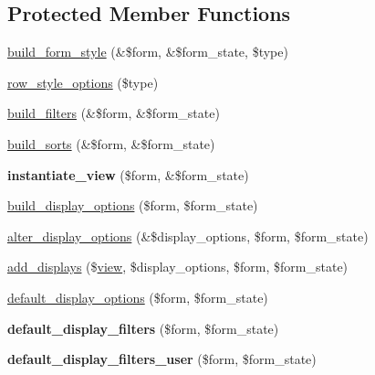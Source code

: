 \subsection*{Protected Member Functions}
\begin{DoxyCompactItemize}
\item 
\hyperlink{classViewsUiBaseViewsWizard_ac467f4635ccfcf169406f8c90c4e985c}{build\_\-form\_\-style} (\&\$form, \&\$form\_\-state, \$type)
\item 
\hyperlink{classViewsUiBaseViewsWizard_af5c8d4b868a5bf71075c373af3a96252}{row\_\-style\_\-options} (\$type)
\item 
\hyperlink{classViewsUiBaseViewsWizard_a796b382ac41d2b3cab1352fffac9a015}{build\_\-filters} (\&\$form, \&\$form\_\-state)
\item 
\hyperlink{classViewsUiBaseViewsWizard_ab6b0be6b141147b10dd10cf9eae59e0e}{build\_\-sorts} (\&\$form, \&\$form\_\-state)
\item 
\hypertarget{classViewsUiBaseViewsWizard_a8e37147b78b5b8790fca4829f7b47a8e}{
{\bfseries instantiate\_\-view} (\$form, \&\$form\_\-state)}
\label{classViewsUiBaseViewsWizard_a8e37147b78b5b8790fca4829f7b47a8e}

\item 
\hyperlink{classViewsUiBaseViewsWizard_a7a12effa5cd30673c45c00c4c21ee5dc}{build\_\-display\_\-options} (\$form, \$form\_\-state)
\item 
\hyperlink{classViewsUiBaseViewsWizard_ab27a3f84ed71dca5754bc53254f079f8}{alter\_\-display\_\-options} (\&\$display\_\-options, \$form, \$form\_\-state)
\item 
\hyperlink{classViewsUiBaseViewsWizard_a8d817fb64a28ebd753b40b0af96c19f4}{add\_\-displays} (\$\hyperlink{classview}{view}, \$display\_\-options, \$form, \$form\_\-state)
\item 
\hyperlink{classViewsUiBaseViewsWizard_a862c9e72a5e11fd78baa1992581f1410}{default\_\-display\_\-options} (\$form, \$form\_\-state)
\item 
\hypertarget{classViewsUiBaseViewsWizard_ace380f59825f718849e37250d11f6f3d}{
{\bfseries default\_\-display\_\-filters} (\$form, \$form\_\-state)}
\label{classViewsUiBaseViewsWizard_ace380f59825f718849e37250d11f6f3d}

\item 
\hypertarget{classViewsUiBaseViewsWizard_a53d02afb114c73e2db6b9a5735308399}{
{\bfseries default\_\-display\_\-filters\_\-user} (\$form, \$form\_\-state)}
\label{classViewsUiBaseViewsWizard_a53d02afb114c73e2db6b9a5735308399}


\end{DoxyCompactItemize}
